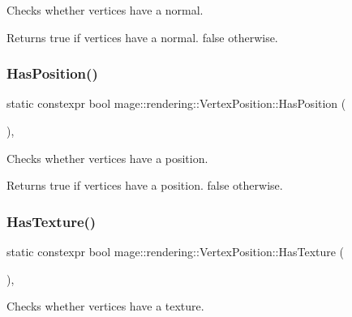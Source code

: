 Checks whether vertices have a normal.

\begin{DoxyReturn}{Returns}
{\ttfamily true} if vertices have a normal. {\ttfamily false} otherwise. 
\end{DoxyReturn}
\hypertarget{structmage_1_1rendering_1_1_vertex_position_a23134a6f43a36f72f94ec6dba3024503}{}\label{structmage_1_1rendering_1_1_vertex_position_a23134a6f43a36f72f94ec6dba3024503} 
\subsubsection{\texorpdfstring{Has\+Position()}{HasPosition()}}
{\footnotesize\ttfamily static constexpr bool mage\+::rendering\+::\+Vertex\+Position\+::\+Has\+Position (\begin{DoxyParamCaption}{ }\end{DoxyParamCaption})\hspace{0.3cm}{\ttfamily [static]}, {\ttfamily [noexcept]}}

Checks whether vertices have a position.

\begin{DoxyReturn}{Returns}
{\ttfamily true} if vertices have a position. {\ttfamily false} otherwise. 
\end{DoxyReturn}
\hypertarget{structmage_1_1rendering_1_1_vertex_position_aac518715cc922a0094261f075f8ae80b}{}\label{structmage_1_1rendering_1_1_vertex_position_aac518715cc922a0094261f075f8ae80b} 
\subsubsection{\texorpdfstring{Has\+Texture()}{HasTexture()}}
{\footnotesize\ttfamily static constexpr bool mage\+::rendering\+::\+Vertex\+Position\+::\+Has\+Texture (\begin{DoxyParamCaption}{ }\end{DoxyParamCaption})\hspace{0.3cm}{\ttfamily [static]}, {\ttfamily [noexcept]}}

Checks whether vertices have a texture.

